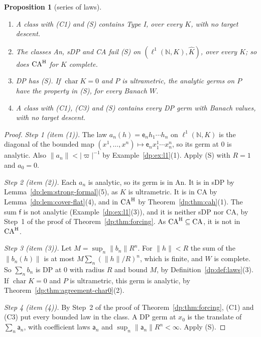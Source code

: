 \documentclass[11pt]{amsart}
\newtheorem{proposition}[theorem]{Proposition}
\theoremstyle{definition}
\theoremstyle{remark}
\numberwithin{equation}{section}
\newcommand{\N}{\mathbb N}
\newcommand{\abs}[1]{\lvert #1\rvert}
\newcommand{\norm}[1]{\lVert #1\rVert}
\newcommand{\Kh}{\widehat K}
\theoremstyle{plain}
\theoremstyle{definition}
\theoremstyle{plain}
\begin{document}
\begin{proposition}[series of laws]\label{dp:prop:s-axiom}
\leavevmode
\begin{enumerate}
\item A class with \textup{(C1)} and \textup{(S)} contains Type I, over every $K$, with no target descent.
\item The classes An, sDP and CA fail \textup{(S)} on $(\ell^1(\N,K),\Kh)$, over every $K$; so does $\mathrm{CA}^{\rm H}$ for $K$ complete.
\item DP has \textup{(S)}. If $\operatorname{char}K=0$ and $P$ is ultrametric, the analytic germs on $P$ have the property in \textup{(S)}, for every Banach $W$.
\item A class with \textup{(C1)}, \textup{(C3)} and \textup{(S)} contains every DP germ with Banach values, with no target descent.
\end{enumerate}
\end{proposition}

\begin{proof}
\emph{Step 1 (item (1)).} The law $a_n(h)=\mathsf e_nh_1\cdots h_n$ on $\ell^1(\N,K)$ is the diagonal of the bounded map $(x^1,\dots,x^n)\mapsto\mathsf e_nx^1_1\cdots x^n_n$, so its germ at $0$ is analytic. Also $\norm{a_n}<\abs\varpi^{-1}$ by Example~\ref{dp:ex:l1}(1). Apply (S) with $R=1$ and $a_0=0$.

\emph{Step 2 (item (2)).} Each $a_n$ is analytic, so its germ is in An. It is in sDP by Lemma~\ref{dp:lem:strong-formal}(5), as $\Kh$ is ultrametric. It is in CA by Lemma~\ref{dp:lem:cover-flat}(4), and in $\mathrm{CA}^{\rm H}$ by Theorem~\ref{dp:thm:cah}(1). The sum $\mathsf f$ is not analytic (Example~\ref{dp:ex:l1}(3)), and it is neither sDP nor CA, by Step~1 of the proof of Theorem~\ref{dp:thm:forcing}. As $\mathrm{CA}^{\rm H}\subseteq\mathrm{CA}$, it is not in $\mathrm{CA}^{\rm H}$.

\emph{Step 3 (item (3)).} Let $M=\sup_n\norm{b_n}R^n$. For $\norm h<R$ the sum of the $\norm{b_n(h)}$ is at most $M\sum_n(\norm h/R)^n$, which is finite, and $W$ is complete. So $\sum_nb_n$ is DP at $0$ with radius $R$ and bound $M$, by Definition~\ref{dp:def:laws}(3). If $\operatorname{char}K=0$ and $P$ is ultrametric, this germ is analytic, by Theorem~\ref{dp:thm:agreement-char0}(2).

\emph{Step 4 (item (4)).} By Step~2 of the proof of Theorem~\ref{dp:thm:forcing}, (C1) and (C3) put every bounded law in the class. A DP germ at $x_0$ is the translate of $\sum_n\mathsf a_n$, with coefficient laws $\mathsf a_n$ and $\sup_n\norm{\mathsf a_n}R^n<\infty$. Apply (S).
\end{proof}
\end{document}
